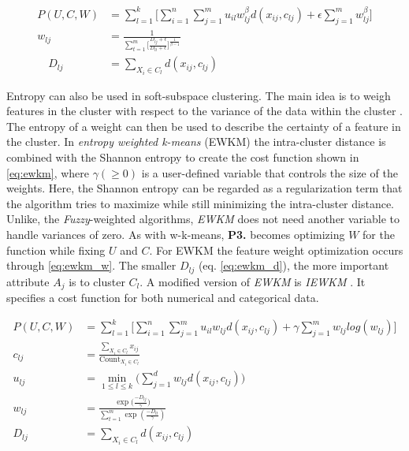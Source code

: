 \documentclass[../report.tex]{subfiles}
\begin{document}
\begin{align}
\label{eq:cost-fsc}
  P(U,C,W) &= \sum^k_{l=1} \Bigg[ \sum^n_{i=1} \sum^m_{j=1} u_{il} w_{ lj }^{\beta} d(x_{ij},c_{lj}) + \epsilon \sum_{j=1}^{m}{ w_{lj}^{\beta} } \Bigg] \\
\label{eq:fsc}
w_{lj} &= \frac{1}{{\sum_{t=1}^{m}\Big[\frac{D_{lj} + \epsilon}{D_{lt} + \epsilon}}\Big]^{\frac{1}{\beta - 1}}} \\
\quad D_{ lj } &= \sum_{X_i \in C_l}{d(x_{ij},c_{ lj })}
\end{align}


Entropy can also be used in soft-subspace clustering. The main idea is to weigh features in the cluster with respect to the variance of the data within the cluster \cite{Domeniconi2007}. The entropy of a weight can then be used to describe the certainty of a feature in the cluster. In \textit{entropy weighted k-means} (EWKM) \cite{Jing2007} the intra-cluster distance is combined with the Shannon entropy to create the cost function shown in \cref{eq:ewkm}, where $\gamma (\geq 0)$ is a user-defined variable that controls the size of the weights. Here, the Shannon entropy can be regarded as a regularization term that the algorithm tries to maximize while still minimizing the intra-cluster distance. Unlike, the \textit{Fuzzy}-weighted algorithms, \textit{EWKM} does not need another variable to handle variances of zero. As with w-k-means, \textbf{P3.} becomes optimizing $W$ for the function while fixing $U$ and $C$. For EWKM the feature weight optimization occurs through \cref{eq:ewkm_w}. The smaller $D_{ lj }$ (eq. \ref{eq:ewkm_d}), the more important attribute $A_j$ is to cluster $C_l$. A modified version of \textit{EWKM} is \textit{IEWKM} \cite{Li2008}. It specifies a cost function for both numerical and categorical data.

\begin{align}
\label{eq:ewkm}
  P(U,C,W) &= \sum^k_{l=1} \Bigg[ \sum^n_{i=1} \sum^m_{j=1} u_{il} w_{ lj } d(x_{ij},c_{lj}) + \gamma \sum_{j=1}^{m}{ w_{lj} log (w_{lj}) } \Bigg] \\
c_{lj} &= \frac{\sum_{X_i \in C_l}{ x_{ij} }}{\text{Count}_{X_i \in C_l}} \\
u_{lj} &= \min_{1 \leq l \leq k}\Big( \sum_{j=1}^{d} w_{lj} d(x_{ij},c_{ lj })\Big) \\
\label{eq:ewkm_w}
w_{lj} &= \frac{\exp({\frac{-D_{lj}}{\gamma})}}{\sum_{t=1}^{m}{\exp{(\frac{-D_{lt}}{\gamma})}}} \\
\label{eq:ewkm_d}
D_{ lj } &= \sum_{X_i \in C_l}{d(x_{ij},c_{ lj })}
\end{align}
\end{document}
